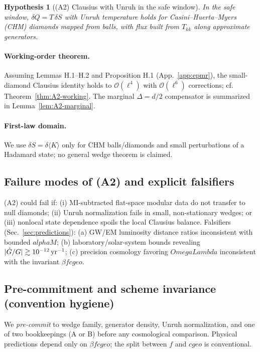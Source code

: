 \documentclass[aps,prd,onecolumn,superscriptaddress,nofootinbib]{revtex4-2}
\def\OmL{OmegaLambda}%
\def\cgeo{cgeo}%
\def\alphaM{alphaM}%
\newcommand{\OmL}{\Omega_\Lambda}
\newcommand{\cgeo}{c_{\rm geo}}
\newcommand{\alphaM}{\alpha_M}
\newtheorem{hypothesis}{Hypothesis}
\begin{document}
\begin{hypothesis}[(A2) Clausius with Unruh in the safe window]
\label{hyp:A2}
In the safe window, $\delta Q=T\,\delta S$ with Unruh temperature holds for \emph{Casini--Huerta--Myers (CHM)} diamonds mapped from balls, with flux built from $T_{kk}$ along approximate generators.
\end{hypothesis}

\paragraph{Working-order theorem.} Assuming Lemmas H.1–H.2 and Proposition H.1 (App.~\ref{app:epmr}), the small-diamond Clausius identity holds to $\mathcal O(\ell^4)$ with $\mathcal O(\ell^6)$ corrections; cf. Theorem~\ref{thm:A2-working}. The marginal $\Delta=d/2$ compensator is summarized in Lemma~\ref{lem:A2-marginal}.

\paragraph{First-law domain.} We use $\delta S=\delta\langle K\rangle$ only for CHM balls/diamonds and small perturbations of a Hadamard state; no general wedge theorem is claimed.

\subsection{Failure modes of (A2) and explicit falsifiers}
\label{sec:a2-fail}
(A2) could fail if: (i) MI-subtracted flat-space modular data do not transfer to null diamonds; (ii) Unruh normalization fails in small, non-stationary wedges; or (iii) nonlocal state dependence spoils the local Clausius balance. Falsifiers (Sec.~\ref{sec:predictions}): (a) GW/EM luminosity distance ratios inconsistent with bounded $\alphaM$; (b) laboratory/solar-system bounds revealing $|\dot G/G|\gtrsim 10^{-12}\,{\rm yr}^{-1}$; (c) precision cosmology favoring $\OmL$ inconsistent with the invariant $\beta f \cgeo$.

\subsection{Pre-commitment and scheme invariance (convention hygiene)}
\label{sec:precommit}
We \emph{pre-commit} to wedge family, generator density, Unruh normalization, and one of two bookkeepings (A or B) before any cosmological comparison. Physical predictions depend only on $\beta f \cgeo$; the split between $f$ and $\cgeo$ is conventional.
\end{document}
